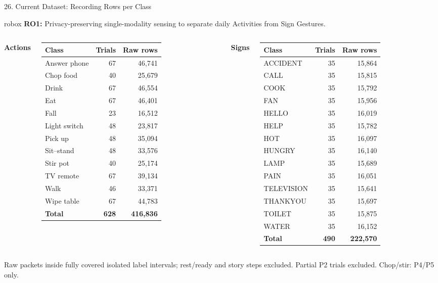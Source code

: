 \documentclass[aspectratio=169,11pt,xcolor=table]{beamer}
\newcommand{\ROoneSent}{Privacy-preserving single-modality sensing to separate daily Activities from Sign Gestures.}
\newcommand{\robox}[1]{%
    \vspace{-0.12cm}%
    \begin{beamercolorbox}[
        wd=0.965\textwidth,
        sep=4pt,
        rounded=true
    ]{robox}
        \scriptsize #1
    \end{beamercolorbox}%
    \vspace{0.10cm}%
}
\newcommand{\roone}{\robox{\textbf{RO1:} \ROoneSent}}
\newcommand{\implnote}[1]{{\scriptsize\color{AmritaDark}#1\par}}
\begin{document}
\begin{frame}{26. Current Dataset: Recording Rows per Class}
\roone
\begin{columns}[T,onlytextwidth]
{\small\textbf{\color{AmritaMaroon}Actions}}\\[4pt]
\fontsize{7}{8.1}\selectfont\renewcommand{\arraystretch}{0.94}
\begin{tabular}{@{}lrr@{}}\toprule
\textbf{Class} & \textbf{Trials} & \textbf{Raw rows}\\\midrule
Answer phone & 67 & 46,741\\
Chop food & 40 & 25,679\\
Drink & 67 & 46,554\\
Eat & 67 & 46,401\\
Fall & 23 & 16,512\\
Light switch & 48 & 23,817\\
Pick up & 48 & 35,094\\
Sit--stand & 48 & 33,576\\
Stir pot & 40 & 25,174\\
TV remote & 67 & 39,134\\
Walk & 46 & 33,371\\
Wipe table & 67 & 44,783\\
\midrule\textbf{Total} & \textbf{628} & \textbf{416,836}\\
\bottomrule\end{tabular}
{\small\textbf{\color{AmritaMaroon}Signs}}\\[4pt]
\fontsize{7}{8.1}\selectfont\renewcommand{\arraystretch}{0.94}
\begin{tabular}{@{}lrr@{}}\toprule
\textbf{Class} & \textbf{Trials} & \textbf{Raw rows}\\\midrule
ACCIDENT & 35 & 15,864\\
CALL & 35 & 15,815\\
COOK & 35 & 15,792\\
FAN & 35 & 15,956\\
HELLO & 35 & 16,019\\
HELP & 35 & 15,782\\
HOT & 35 & 16,097\\
HUNGRY & 35 & 16,140\\
LAMP & 35 & 15,689\\
PAIN & 35 & 16,051\\
TELEVISION & 35 & 15,641\\
THANKYOU & 35 & 15,697\\
TOILET & 35 & 15,875\\
WATER & 35 & 16,152\\
\midrule\textbf{Total} & \textbf{490} & \textbf{222,570}\\
\bottomrule\end{tabular}
\end{columns}
\vspace{0.10cm}
\implnote{Raw packets inside fully covered isolated label intervals; rest/ready and story steps excluded.
Partial P2 trials excluded. Chop/stir: P4/P5 only.}
\end{frame}
\end{document}
